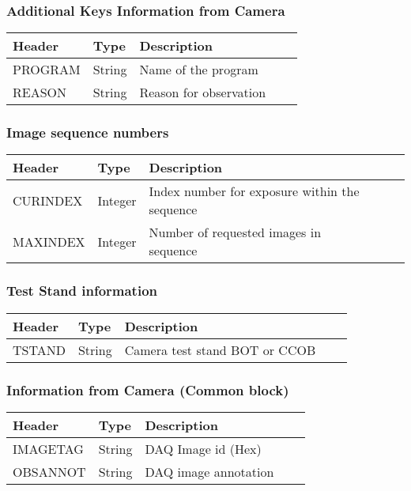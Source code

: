 \subsubsection{Additional Keys Information from Camera}


\begin{tabular}{l l l l l}
\hline
Header & Type & Description \\
\hline
PROGRAM & String & Name of the program \\
REASON & String & Reason for observation \\
\hline
\end{tabular}


\subsubsection{Image sequence numbers}


\begin{tabular}{l l l l l}
\hline
Header & Type & Description \\
\hline
CURINDEX & Integer & Index number for exposure within the sequence \\
MAXINDEX & Integer & Number of requested images in sequence \\
\hline
\end{tabular}


\subsubsection{Test Stand information}


\begin{tabular}{l l l l l}
\hline
Header & Type & Description \\
\hline
TSTAND & String & Camera test stand BOT or CCOB \\
\hline
\end{tabular}


\subsubsection{Information from Camera (Common block)}


\begin{tabular}{l l l l l}
\hline
Header & Type & Description \\
\hline
IMAGETAG & String & DAQ Image id (Hex) \\
OBSANNOT & String & DAQ image annotation \\
\hline
\end{tabular}


